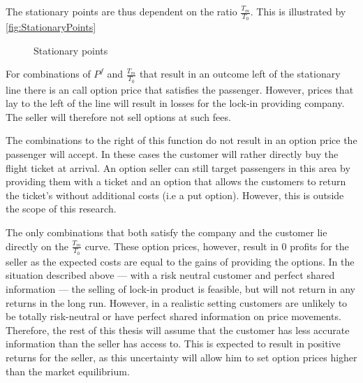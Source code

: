 The stationary points are thus dependent on the ratio $\frac{T_m}{T_0}$. This is illustrated by \autoref{fig:StationaryPoints}
\begin{figure*}
    \centering
    \caption{Stationary points}
    \label{fig:StationaryPoints}
\end{figure*}

For combinations of $P^f$ and $\frac{T_m}{T_0}$ that result in an outcome left of the stationary line there is an call option price that satisfies the passenger. However, prices that lay to the left of the line will result in losses for the lock-in providing company. The seller will therefore not sell options at such fees.

The combinations to the right of this function do not result in an option price the passenger will accept. In these cases the customer will rather directly buy the flight ticket at arrival. An option seller can still target passengers in this area by providing them with a ticket and an option that allows the customers to return the ticket's without additional costs (i.e a put option). However, this is outside the scope of this research.

The only combinations that both satisfy the company and the customer lie directly on the $\frac{T_m}{T_0}$ curve. These option prices, however, result in $0$ profits for the seller as the expected costs are equal to the gains of providing the options. In the situation described above --- with a risk neutral customer and perfect shared information --- the selling of lock-in product is feasible, but will not return in any returns in the long run. However, in a realistic setting customers are unlikely to be totally risk-neutral or have perfect shared information on price movements. Therefore, the rest of this thesis will assume that the customer has less accurate information than the seller has access to. This is expected to result in positive returns for the seller, as this uncertainty will allow him to set option prices higher than the market equilibrium.



